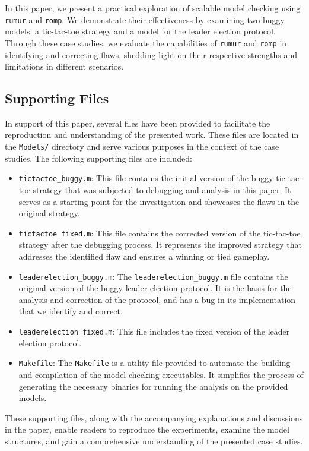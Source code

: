 In this paper, we present a practical exploration of scalable model checking
using \texttt{rumur} and \texttt{romp}.
We demonstrate their effectiveness by examining two buggy models:
a tic-tac-toe strategy and a model for the leader election protocol.
Through these case studies, we evaluate the capabilities of
\texttt{rumur} and \texttt{romp} in identifying and correcting flaws,
shedding light on their respective strengths and limitations in different
scenarios.

\subsection{Supporting Files}\label{subsec:supporting-files}

In support of this paper, several files have been provided to facilitate the
reproduction and understanding of the presented work.
These files are located in the \texttt{Models/} directory and serve various
purposes in the context of the case studies.
The following supporting files are included:

\begin{itemize}
    \item \texttt{tictactoe\_buggy.m}: This file contains the initial version
    of the buggy tic-tac-toe strategy that was subjected to debugging and
    analysis in this paper.
    It serves as a starting point for the investigation and showcases the
    flaws in the original strategy.

    \item \texttt{tictactoe\_fixed.m}: This file contains the corrected
    version of the tic-tac-toe strategy after the debugging process.
    It represents the improved strategy that addresses the identified flaw
    and ensures a winning or tied gameplay.

    \item \texttt{leaderelection\_buggy.m}: The \texttt{leaderelection\_buggy.m}
    file contains the original version of the buggy leader election protocol.
    It is the basis for the analysis and correction of the protocol,
    and has a bug in its implementation that we identify and correct.

    \item \texttt{leaderelection\_fixed.m}: This file includes the fixed version
    of the leader election protocol.

    \item \texttt{Makefile}: The \texttt{Makefile} is a utility file provided
    to automate the building and compilation of the model-checking executables.
    It simplifies the process of generating the necessary binaries for
    running the analysis on the provided models.
\end{itemize}

These supporting files, along with the accompanying explanations and
discussions in the paper, enable readers to reproduce the experiments,
examine the model structures, and gain a comprehensive understanding of the
presented case studies.
